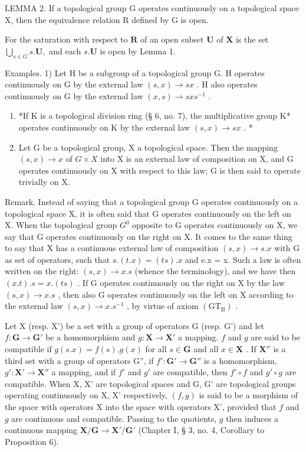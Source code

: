LEMMA 2. If a topological group G operates continuously on a topological space X, then the equivalence relation R defined by G is open.

For the saturation with respect to \(\mathbf{R}\) of an open subset \(\mathbf{U}\) of \(\mathbf{X}\) is the set \(\bigcup_{s\in G}s.\mathbf{U},\) and each \(s.\mathbf{U}\) is open by Lemma 1.

Examples. 1) Let H be a subgroup of a topological group G. H operates continuously on G by the external law \((s, x) \rightarrow sx\) . H also operates continuously on G by the external law \((x, s) \rightarrow sxs^{-1}\) .

\begin{enumerate}
\def\labelenumi{\arabic{enumi})}
\setcounter{enumi}{1}
\item
  *If K is a topological division ring (§ 6, no. 7), the multiplicative group K* operates continuously on K by the external law \((s, x) \to sx\) . *
\item
  Let G be a topological group, X a topological space. Then the mapping \((s, x) \to x\) of \(G \times X\) into X is an external law of composition on X, and G operates continuously on X with respect to this law; G is then said to operate trivially on X.
\end{enumerate}

Remark. Instead of saying that a topological group G operates continuously on a topological space X, it is often said that G operates continuously on the left on X. When the topological group \(G^{0}\) opposite to G operates continuously on X, we say that G operates continuously on the right on X. It comes to the same thing to say that X has a continuous external law of composition \((s, x) \to s.x\) with G as set of operators, such that \(s.(t.x) = (ts).x\) and e.x = x. Such a law is often written on the right: \((s, x) \to x.s\) (whence the terminology), and we have then \((x.t).s = x.(ts)\) . If G operates continuously on the right on X by the law \((s, x) \to x.s\) , then also G operates continuously on the left on X according to the external law \((s, x) \to x.s^{-1}\) , by virtue of axiom \((\mathrm{GT}_{\mathrm{II}})\) .

Let X (resp. X') be a set with a group of operators G (resp. G') and let \(f: \mathbf{G} \to \mathbf{G}'\) be a homomorphism and \(g: \mathbf{X} \to \mathbf{X}'\) a mapping. \(f\) and \(g\) are said to be compatible if \(g(s.x) = f(s).g(x)\) for all \(s \in \mathbf{G}\) and all \(x \in \mathbf{X}\) . If \(\mathbf{X}''\) is a third set with a group of operators G'', if \(f': \mathbf{G}' \to \mathbf{G}''\) is a homomorphism, \(g': \mathbf{X}' \to \mathbf{X}''\) a mapping, and if \(f'\) and \(g'\) are compatible, then \(f' \circ f\) and \(g' \circ g\) are compatible. When X, X' are topological spaces and G, G' are topological groups operating continuously on X, X' respectively, \((f, g)\) is said to be a morphism of the space with operators X into the space with operators X', provided that \(f\) and \(g\) are continuous and compatible. Passing to the quotients, \(g\) then induces a continuous mapping \(\mathbf{X}/\mathbf{G} \to \mathbf{X}'/\mathbf{G}'\) (Chapter I, § 3, no. 4, Corollary to Proposition 6).


